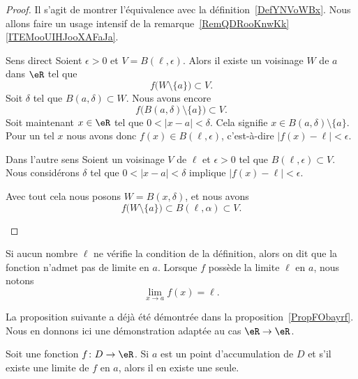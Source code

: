 \begin{proof}
    Il s'agit de montrer l'équivalence avec la définition~\ref{DefYNVoWBx}. Nous allons faire un usage intensif de la remarque~\ref{RemQDRooKnwKk}\ref{ITEMooUIHJooXAFaJa}.
    \begin{subproof}
    \item[Sens direct]
        Soient \( \epsilon>0\) et \( V=B(\ell,\epsilon)\). Alors il existe un voisinage \( W\) de \( a\) dans \( \eR\) tel que
        \begin{equation}
            f\big( W\setminus\{ a \} \big)\subset V.
        \end{equation}
        Soit \( \delta\) tel que \( B(a,\delta)\subset W\). Nous avons encore
        \begin{equation}
            f\big( B(a,\delta)\setminus\{ a \} \big)\subset V.
        \end{equation}
        Soit maintenant \( x\in \eR\) tel que $0<| x-a |<\delta$. Cela signifie \( x\in B(a,\delta)\setminus\{ a \}\). Pour un tel \( x\) nous avons donc \( f(x)\in B(\ell,\epsilon)\), c'est-à-dire \( | f(x)-\ell |<\epsilon\).
    \item[Dans l'autre sens]
        Soient un voisinage \( V\) de \( \ell\) et \( \epsilon>0\) tel que \( B(\ell,\epsilon)\subset V\). Nous considérons \( \delta\) tel que \( 0<| x-a |<\delta\) implique \( | f(x)-\ell |<\epsilon\).

        Avec tout cela nous posons \( W=B(x,\delta)\), et nous avons
        \begin{equation}
            f\big( W\setminus\{ a \} \big)\subset B(\ell,\alpha)\subset V.
        \end{equation}
    \end{subproof}
\end{proof}

Si aucun nombre $\ell$ ne vérifie la condition de la définition, alors on dit que la fonction n'admet pas de limite en $a$. Lorsque $f$ possède la limite $\ell$ en $a$, nous notons
\begin{equation}
	\lim_{x\to a} f(x)=\ell.
\end{equation}

La proposition suivante a déjà été démontrée dans la proposition~\ref{PropFObayrf}. Nous en donnons ici une démonstration adaptée au cas \( \eR\to \eR\).

\begin{proposition}
	Soit une fonction $f\colon D\to \eR$. Si $a$ est un point d'accumulation de $D$ et s'il existe une limite de $f$ en $a$, alors il en existe une seule.
\end{proposition}


